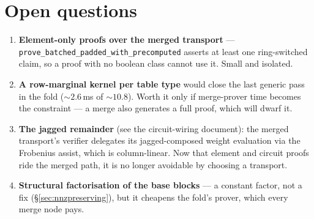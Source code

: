 \documentclass[11pt]{article}
\newcommand{\code}[1]{\texttt{#1}}
\theoremstyle{definition}
\begin{document}
\section{Open questions}\label{sec:open}

\begin{enumerate}[nosep]
  \item \textbf{Element-only proofs over the merged transport} ---
        \code{prove\_batched\_padded\_with\_precomputed} asserts at least one
        ring-switched claim, so a proof with no boolean class cannot use it.
        Small and isolated.
  \item \textbf{A row-marginal kernel per table type} would close the last
        generic pass in the fold (${\sim}2.6$\,ms of ${\sim}10.8$). Worth it
        only if merge-prover time becomes the constraint --- a merge also
        generates a full proof, which will dwarf it.
  \item \textbf{The jagged remainder} (see the circuit-wiring document): the
        merged transport's verifier delegates its jagged-composed weight
        evaluation via the Frobenius assist, which is column-linear. Now
        that element and circuit proofs ride the merged path, it is no
        longer avoidable by choosing a transport.
  \item \textbf{Structural factorisation of the base blocks} --- a constant
        factor, not a fix (\S\ref{sec:nnzpreserving}), but it cheapens the
        fold's prover, which every merge node pays.
\end{enumerate}
\end{document}
